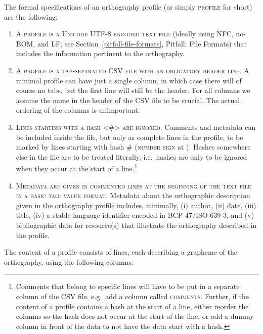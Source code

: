 The formal specifications of an orthography profile (or simply \textsc{profile}
for short) are the following:

\begin{enumerate}
	\def\labelenumi{\arabic{enumi}.} 
	\item \textsc{A profile is a} \textsc{Unicode UTF-8 encoded text file} (ideally using NFC, no-BOM, and LF; see Section~\ref{pitfall-file-formats}, Pitfall: File Formats) that includes the information pertinent to the orthography. 
	\item \textsc{A profile is a} \textsc{tab-separated CSV file with an obligatory header line}. A minimal profile can have just a single column, in which case there will of course no tabs, but the first line will still be the header. For all columns we assume the name in the header of the CSV file to be crucial. The actual ordering of the columns is unimportant. 
	\item \textsc{Lines starting with a hash \textless{}\#\textgreater{} are ignored.} Comments and metadata can be included inside the file, but only as complete lines in the profile, to be marked by lines starting with hash \textsc{\#} (\textsc{number sign} at ). Hashes somewhere else in the file are to be treated literally, i.e.~hashes are only to be ignored when they occur at the start of a line.\footnote{Comments that belong to specific lines will have to be put in a separate column of the CSV file, e.g.~add a column called \textsc{comments}. Further, if the content of a profile contains a hash at the start of a line, either reorder the columns so the hash does not occur at the start of the line, or add a dummy column in front of the data to not have the data start with a hash.} 
	\item \textsc{Metadata are given in commented lines at the beginning of the text file in a basic \textsc{tag: value} format. }Metadata about the orthographic description given in the orthography profile includes, minimally, (i) author, (ii) date, (iii) title, (iv) a stable language identifier encoded in BCP 47/ISO 639-3, and (v) bibliographic data for resource(s) that illustrate the orthography described in the profile. 
\end{enumerate}

The content of a profile consists of lines, each describing a grapheme of the
orthography, using the following columns:

